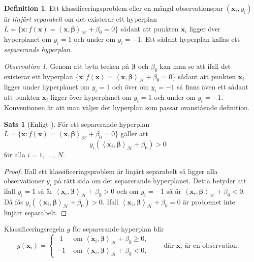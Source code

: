 \documentclass[a4paper, 12pt]{report}
\theoremstyle{definition}
\newtheorem{thm}{Sats}[section]
\newtheorem{defi}{Definition}[section]
\theoremstyle{remark}
\newtheorem*{rem}{Observation}
\newcommand{\bfbeta}{{\boldsymbol{\beta}}}
\newcommand{\bfx}{\mathbf{x}}
\newcommand{\llangle}{\left\langle}
\newcommand{\rrangle}{\right\rangle}
\newcommand{\sephyp}{\{ \mathbf{x} : f\left(\mathbf{x}\right)=\inner{\bfx}{\bfbeta}_\mathcal{H} + \beta_0=0\}}
\newcommand{\inner}[2]{\llangle #1, #2 \rrangle}
\newcommand{\hil}{\mathcal{H}}
\begin{document}
\begin{defi}
	Ett klassificeringsproblem eller en mängd observationspar $\left(\mathbf{x}_i, y_i\right)$ är \textit{linjärt separabelt} om det existerar ett hyperplan $L=\sephyp$ sådant att punkten $\bfx_i$ ligger över hyperplanet om $y_i=1$ och under om $y_i=-1$. Ett sådant hyperplan kallas ett \emph{separerande hyperplan}.
\end{defi}
\begin{rem}
	Genom att byta tecken på $\bfbeta$ och $\beta_0$ kan man se att ifall det existerar ett hyperplan $\sephyp$ sådant att punkten $\bfx_i$ ligger under hyperplanet om $y_i=1$ och över om $y_i=-1$ så finns även ett sådant att punkten $\bfx_i$ ligger över hyperplanet om $y_i=1$ och under om $y_i=-1$.
	Konventionen är att man väljer det hyperplan som passar ovanstående definition.
\end{rem}
\begin{thm}[Enligt \cite{Boyd}]\label{thm:sephyppositive}
	För ett separerande hyperplan $L=\sephyp$ gäller att 
	\begin{equation*}
		y_i\left(\inner{\bfx_i}{\bfbeta}_\hil + \beta_0\right) > 0
	\end{equation*}
	för alla $i = 1,~\dots,~N$.
\end{thm}
\begin{proof}
	Ifall ett klassificeringsproblem är linjärt separabelt så ligger alla observationer $y_i$ på rätt sida om det separerande hyperplanet. Detta betyder att ifall $y_i=1$ så är $\inner{\bfx_i}{\bfbeta}_\hil + \beta_0 > 0$ och om $y_i=-1$ så är $\inner{\bfx_i}{\bfbeta}_\hil + \beta_0 < 0$.
	Då fås $y_i\left(\inner{\bfx_i}{\bfbeta}_\hil + \beta_0\right) > 0$. Ifall $\inner{\bfx_i}{\bfbeta}_\hil + \beta_0 = 0$ är problemet inte linjärt separabelt.
\end{proof}

Klassificeringsregeln $g$ för separerande hyperplan blir
\begin{equation*}
g\left(\mathbf{x}_i\right)=  
\begin{cases}
~~ 1 &\text{ om } \inner{\bfx_i}{\bfbeta}_\hil + \beta_0 \geq 0,\\
-1 &\text{ om } \inner{\bfx_i}{\bfbeta}_\hil + \beta_0 < 0,
\end{cases}\qquad\text{där }\bfx_i\text{ är en observation.}
\end{equation*}
\end{document}

